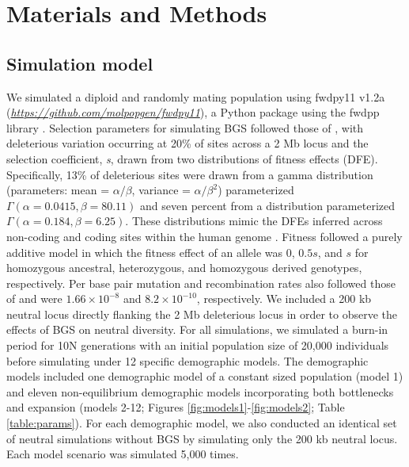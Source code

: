 \documentclass[9pt,twocolumn,twoside]{rilabRxiv}
\begin{document}
\section{Materials and Methods}
\label{sec:materials:methods}

\subsection{Simulation model}

We simulated a diploid and randomly mating population using fwdpy11 v1.2a (\href{https://github.com/molpopgen/fwdpy11}{\emph{https://github.com/molpopgen/fwdpy11}}), a Python package using the fwdpp library \citep{thornton2014c++}.
Selection parameters for simulating BGS followed those of \citet{torres2018human}, with deleterious variation occurring at 20\% of sites across a 2 Mb locus and the selection coefficient, \textit{s}, drawn from two distributions of fitness effects (DFE).
Specifically, 13\% of deleterious sites were drawn from a gamma distribution (parameters: mean = $\alpha/\beta$, variance = $\alpha/\beta^2$) parameterized $\Gamma(\alpha = 0.0415, \beta = 80.11)$ and seven percent from a distribution parameterized $\Gamma(\alpha = 0.184, \beta = 6.25)$.
These distributions mimic the DFEs inferred across non-coding and coding sites within the human genome \citep{torgerson2009evolutionary, boyko2008assessing}.
Fitness followed a purely additive model in which the fitness effect of an allele was 0, $0.5s$, and $s$ for homozygous ancestral, heterozygous, and homozygous derived genotypes, respectively.
Per base pair mutation and recombination rates also followed those of \citet{torres2018human} and were $1.66 \times 10^{-8}$ and $8.2 \times 10^{-10}$, respectively.
We included a 200 kb neutral locus directly flanking the 2 Mb deleterious locus in order to observe the effects of BGS on neutral diversity.
For all simulations, we simulated a burn-in period for 10N generations with an initial population size of 20,000 individuals before simulating under 12 specific demographic models.
The demographic models included one demographic model of a constant sized population (model 1) and eleven non-equilibrium demographic models incorporating both bottlenecks and expansion (models 2-12; Figures \ref{fig:models1}-\ref{fig:models2}; Table \ref{table:params}).
For each demographic model, we also conducted an identical set of neutral simulations without BGS by simulating only the 200 kb neutral locus.
Each model scenario was simulated 5,000 times.
\end{document}
